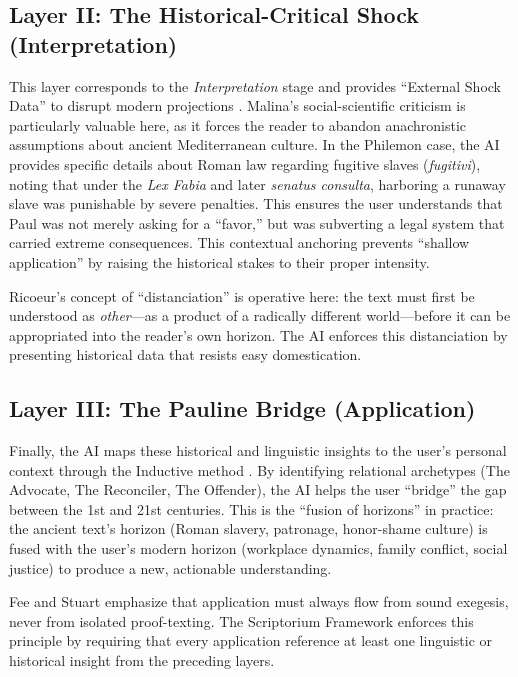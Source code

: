 \subsection{Layer II: The Historical-Critical Shock (Interpretation)}
This layer corresponds to the \textit{Interpretation} stage and provides ``External Shock Data'' to disrupt modern projections \cite{malina2001}. Malina's social-scientific criticism is particularly valuable here, as it forces the reader to abandon anachronistic assumptions about ancient Mediterranean culture. In the Philemon case, the AI provides specific details about Roman law regarding fugitive slaves (\textit{fugitivi}), noting that under the \textit{Lex Fabia} and later \textit{senatus consulta}, harboring a runaway slave was punishable by severe penalties. This ensures the user understands that Paul was not merely asking for a ``favor,'' but was subverting a legal system that carried extreme consequences. This contextual anchoring prevents ``shallow application'' by raising the historical stakes to their proper intensity.

Ricoeur's \cite{ricoeur1976} concept of ``distanciation'' is operative here: the text must first be understood as \textit{other}---as a product of a radically different world---before it can be appropriated into the reader's own horizon. The AI enforces this distanciation by presenting historical data that resists easy domestication.

\subsection{Layer III: The Pauline Bridge (Application)}
Finally, the AI maps these historical and linguistic insights to the user's personal context through the Inductive method \cite{hendricks1991}. By identifying relational archetypes (The Advocate, The Reconciler, The Offender), the AI helps the user ``bridge'' the gap between the 1st and 21st centuries. This is the ``fusion of horizons'' \cite{gadamer1960} in practice: the ancient text's horizon (Roman slavery, patronage, honor-shame culture) is fused with the user's modern horizon (workplace dynamics, family conflict, social justice) to produce a new, actionable understanding.

Fee and Stuart \cite{fee2003} emphasize that application must always flow from sound exegesis, never from isolated proof-texting. The Scriptorium Framework enforces this principle by requiring that every application reference at least one linguistic or historical insight from the preceding layers.

